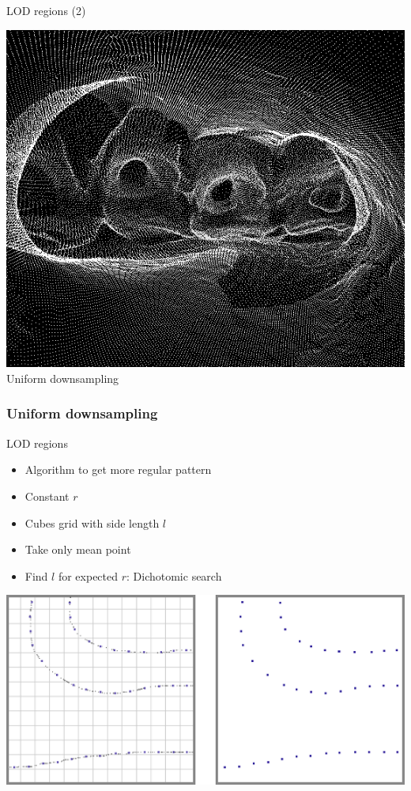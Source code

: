 \documentclass{beamer}
\begin{document}
\begin{frame}{LOD regions (2)}
	\begin{center}
	\includegraphics[width=.7\textwidth]{uniform_example.png} \\
	Uniform downsampling
	\end{center}
\end{frame}

\subsubsection{Uniform downsampling}

\begin{frame}{LOD regions}
	\begin{itemize}
	\item Algorithm to get more regular pattern
	\item Constant $r$
	\item Cubes grid with side length $l$
	\item Take only mean point
	\item Find $l$ for expected $r$: Dichotomic search
	\end{itemize}
	\begin{center}
	\includegraphics[width=.8\textwidth]{uniform.png}
	\end{center}
\end{frame}
\end{document}
